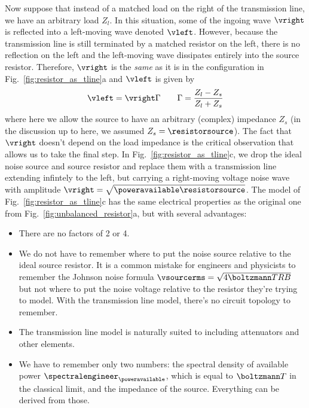 Now suppose that instead of a matched load on the right of the transmission line, we have an arbitrary load $Z_l$.
In this situation, some of the ingoing wave $\vright$ is reflected into a left-moving wave denoted $\vleft$.
However, because the transmission line is still terminated by a matched resistor on the left, there is no reflection on the left and the left-moving wave dissipates entirely into the source resistor.
Therefore, $\vright$ is the \emph{same} as it is in the configuration in Fig.~\ref{fig:resistor_as_tline}a and $\vleft$ is given by 
\begin{equation}
  \vleft = \vright \Gamma \qquad \Gamma = \frac{Z_l - Z_s}{Z_l + Z_s}
\end{equation}
where here we allow the source to have an arbitrary (complex) impedance $Z_s$ (in the discussion up to here, we assumed $Z_s = \resistorsource$).
The fact that $\vright$ doesn't depend on the load impedance is the critical observation that allows us to take the final step.
In Fig.~\ref{fig:resistor_as_tline}c, we drop the ideal noise source and source resistor and replace them with a transmission line extending infintely to the left, but carrying a right-moving voltage noise wave with amplitude $\vright = \sqrt{\poweravailable \resistorsource}$.
The model of Fig.~\ref{fig:resistor_as_tline}c has the same electrical properties as the original one from Fig.~\ref{fig:unbalanced_resistor}a, but with several advantages:
\begin{itemize}
    \item There are no factors of 2 or 4.
    \item We do not have to remember where to put the noise source relative to the ideal source resistor. It is a common mistake for engineers and physicists to remember the Johnson noise formula $\vsourcerms = \sqrt{4 \boltzmann T R B}$ but not where to put the noise voltage relative to the resistor they're trying to model. With the transmission line model, there's no circuit topology to remember.
    \item The transmission line model is naturally suited to including attenuators and other elements.
    \item We have to remember only two numbers: the spectral density of available power $\spectralengineer_{\poweravailable}$, which is equal to $\boltzmann T$ in the classical limit, and the impedance of the source. Everything can be derived from those.
\end{itemize}

